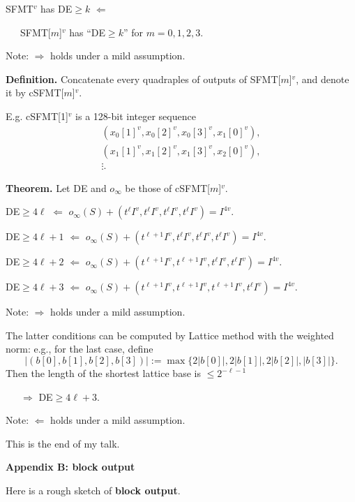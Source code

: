 \documentclass[a4j,12pt,landscape]{jarticle}
\begin{document}
SFMT$^v$ has DE$ \geq k$ 
$\Leftarrow$

~~~SFMT[$m$]$^v$ has ``DE$ \geq k$''
for $m=0,1,2,3$.

Note: $\Rightarrow$ holds under a mild assumption.

\newpage
{\bf Definition.}
Concatenate every quadraples of outputs
of SFMT[$m$]$^v$, and denote it by cSFMT[$m$]$^v$.

E.g. cSFMT[1]$^v$ is a 128-bit integer sequence
$$
\begin{array}{c}
(x_0[1]^v, x_0[2]^v, x_0[3]^v, x_1[0]^v), \\
(x_1[1]^v, x_1[2]^v, x_1[3]^v, x_2[0]^v), \\
 \vdots.
\end{array}
$$

\newpage 
{\bf Theorem.} Let DE and $o_\infty$ be those of cSFMT[$m$]$^v$.

DE$\geq 4\ell$
$\Leftarrow$
$
o_\infty(S) + (t^\ell I^v,  t^\ell I^v,  t^\ell I^v, t^\ell I^v)
=I^{4v}.
$

DE$\geq 4\ell+1$
$\Leftarrow$
$
o_\infty(S) + (t^{\ell+1} I^v,  t^\ell I^v,  t^\ell I^v, t^\ell I^v)
=I^{4v}.
$

DE$\geq 4\ell+2$
$\Leftarrow$
$
o_\infty(S) + (t^{\ell+1} I^v,  t^{\ell+1} I^v,  t^\ell I^v, t^\ell I^v)
=I^{4v}.
$

DE$\geq 4\ell+3$
$\Leftarrow$
$
o_\infty(S) + (t^{\ell+1} I^v,  t^{\ell+1} I^v,  t^{\ell+1} I^v, t^\ell I^v)
=I^{4v}.
$

Note: $\Rightarrow$ holds under a mild assumption.

\newpage
The latter conditions can be computed by Lattice method
with the weighted norm: e.g., for the last case, define
$$
|(b[0], b[1], b[2], b[3])| := \max \{2|b[0]|, 2|b[1]|, 2|b[2]|, |b[3]|\}.
$$
Then the length of the shortest lattice base is $\leq 2^{-\ell-1}$

~~~$\Rightarrow$ DE$\geq 4\ell +3$. 

Note: $\Leftarrow$ holds under a mild assumption.

\vskip 1cm
\begin{center}
This is the end of my talk.
\end{center}

\newpage
{\bf Appendix B: block output}

Here is a rough sketch of {\bf block output}.
\end{document}
